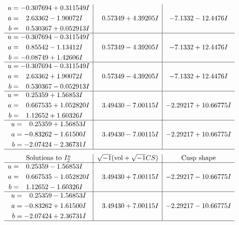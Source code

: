 \documentclass[1p]{elsarticle_modified}
\theoremstyle{definition}
\newcommand{\I}{\sqrt{-1}}
\begin{document}
$$\begin{array}{c|c|c}
\begin{aligned}
u &= -0.307694 + 0.311549 I \\
a &= \phantom{-}2.63362 - 1.90072 I \\
b &= \phantom{-}0.530367 + 0.052913 I\end{aligned}
 & \phantom{-}0.57349 + 4.39205 I & -7.1332 - 12.4476 I \\ \hline\begin{aligned}
u &= -0.307694 - 0.311549 I \\
a &= \phantom{-}0.85542 - 1.13412 I \\
b &= -0.08749 + 1.42606 I\end{aligned}
 & \phantom{-}0.57349 - 4.39205 I & -7.1332 + 12.4476 I \\ \hline\begin{aligned}
u &= -0.307694 - 0.311549 I \\
a &= \phantom{-}2.63362 + 1.90072 I \\
b &= \phantom{-}0.530367 - 0.052913 I\end{aligned}
 & \phantom{-}0.57349 - 4.39205 I & -7.1332 + 12.4476 I \\ \hline\begin{aligned}
u &= \phantom{-}0.25359 + 1.56853 I \\
a &= \phantom{-}0.667535 + 1.052820 I \\
b &= \phantom{-}1.12652 + 1.60326 I\end{aligned}
 & \phantom{-}3.49430 - 7.00115 I & -2.29217 + 10.66775 I \\ \hline\begin{aligned}
u &= \phantom{-}0.25359 + 1.56853 I \\
a &= -0.83262 - 1.61500 I \\
b &= -2.07424 - 2.36731 I\end{aligned}
 & \phantom{-}3.49430 - 7.00115 I & -2.29217 + 10.66775 I\\
 \hline 
 \end{array}$$\newpage$$\begin{array}{c|c|c}  
\text{Solutions to }I^u_{2}& \I (\text{vol} + \sqrt{-1}CS) & \text{Cusp shape}\\
 \hline 
\begin{aligned}
u &= \phantom{-}0.25359 - 1.56853 I \\
a &= \phantom{-}0.667535 - 1.052820 I \\
b &= \phantom{-}1.12652 - 1.60326 I\end{aligned}
 & \phantom{-}3.49430 + 7.00115 I & -2.29217 - 10.66775 I \\ \hline\begin{aligned}
u &= \phantom{-}0.25359 - 1.56853 I \\
a &= -0.83262 + 1.61500 I \\
b &= -2.07424 + 2.36731 I\end{aligned}
 & \phantom{-}3.49430 + 7.00115 I & -2.29217 - 10.66775 I\\
 \hline 
 \end{array}$$\newpage\newpage\renewcommand{\arraystretch}{1}
\end{document}

